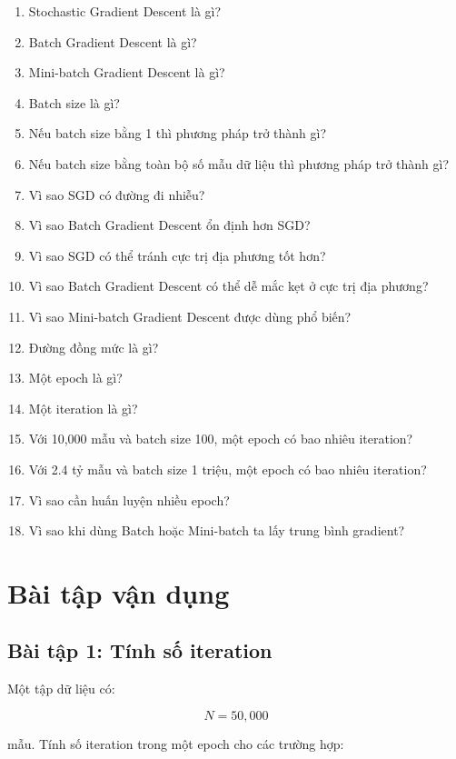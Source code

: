 \documentclass[12pt,a4paper]{report}
\begin{document}
\begin{enumerate}
    \item Stochastic Gradient Descent là gì?
    \item Batch Gradient Descent là gì?
    \item Mini-batch Gradient Descent là gì?
    \item Batch size là gì?
    \item Nếu batch size bằng 1 thì phương pháp trở thành gì?
    \item Nếu batch size bằng toàn bộ số mẫu dữ liệu thì phương pháp trở thành gì?
    \item Vì sao SGD có đường đi nhiễu?
    \item Vì sao Batch Gradient Descent ổn định hơn SGD?
    \item Vì sao SGD có thể tránh cực trị địa phương tốt hơn?
    \item Vì sao Batch Gradient Descent có thể dễ mắc kẹt ở cực trị địa phương?
    \item Vì sao Mini-batch Gradient Descent được dùng phổ biến?
    \item Đường đồng mức là gì?
    \item Một epoch là gì?
    \item Một iteration là gì?
    \item Với 10,000 mẫu và batch size 100, một epoch có bao nhiêu iteration?
    \item Với 2.4 tỷ mẫu và batch size 1 triệu, một epoch có bao nhiêu iteration?
    \item Vì sao cần huấn luyện nhiều epoch?
    \item Vì sao khi dùng Batch hoặc Mini-batch ta lấy trung bình gradient?
\end{enumerate}

\chapter{Bài tập vận dụng}

\section*{Bài tập 1: Tính số iteration}

Một tập dữ liệu có:

\[
    N=50,000
\]

mẫu. Tính số iteration trong một epoch cho các trường hợp:
\end{document}
